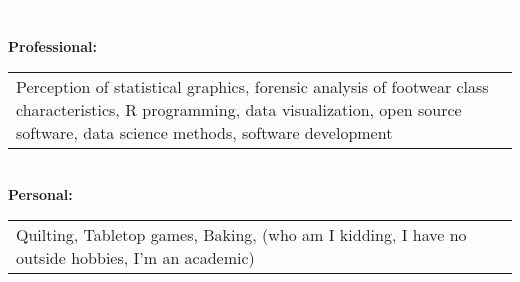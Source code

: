 \newcommand{\textBox}[1]{
\hspace*{7pt}
\begin{tabular}{  p{\dimexpr 0.97\linewidth-2\tabcolsep} }
  	{\normalsize #1}
\end{tabular}
\vspace*{10pt}
}

\LARGE
\noindent\colorbox{materialYellow}
{\parbox[c][25pt][c]{\textwidth}{\hspace{15pt}\textcolor{white}{Interests}}} %

\large
\vspace*{10pt}

{\textbf{Professional:}}\\
\textBox{
Perception of statistical graphics, forensic analysis of footwear class characteristics, R programming, data visualization, open source software, data science methods, software development
}\\

{\textbf{Personal:}}\\
\textBox{
Quilting, Tabletop games, Baking, (who am I kidding, I have no outside hobbies, I'm an academic)
}\\

\vspace*{10pt}
